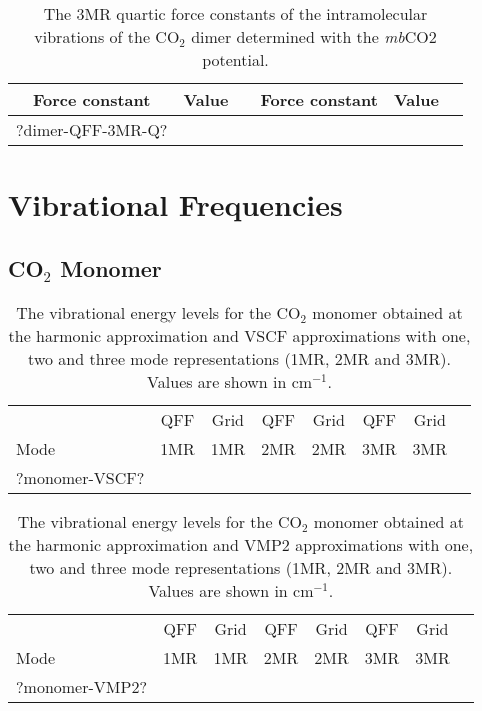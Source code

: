 \documentclass[aip,jcp,showpacs,superscriptaddress,groupedaddress]{revtex4-1}  %
\begin{document}
\begin{table}[H]
\centering
\caption{The 3MR quartic force constants of the intramolecular vibrations of the CO$_2$ dimer determined with the \emph{mb}CO2 potential.}
\label{table:qff_dimer-3mr-q}
\begin{ruledtabular}
\begin{tabular}{cccccc}
Force constant & Value      &  & Force constant & Value      &    \\
\hline \Tstrut
?dimer-QFF-3MR-Q?
\end{tabular}
\end{ruledtabular}
\end{table}

\section[S2]{\label{sec:vibrations}Vibrational Frequencies}

\subsection{\label{sec:monomer-freq}CO$_2$ Monomer}

\begin{table}[H]
\caption{The vibrational energy levels for the CO$_2$ monomer obtained at the harmonic approximation and VSCF approximations with one, two and three mode representations (1MR, 2MR and 3MR). Values are shown in cm$^{-1}$.}
\begin{ruledtabular}
\begin{tabular}{lccccccc}
    & QFF &  Grid & QFF & Grid & QFF & Grid   \\  
  Mode & 1MR & 1MR & 2MR & 2MR & 3MR & 3MR   \\ 
\hline \Tstrut
?monomer-VSCF?
\end{tabular}
\end{ruledtabular}
\label{table:monomer-vscf}
\end{table}  

\begin{table}[h]
\caption{The vibrational energy levels for the CO$_2$ monomer obtained at the harmonic approximation and VMP2 approximations with one, two and three mode representations (1MR, 2MR and 3MR). Values are shown in cm$^{-1}$.}
\begin{ruledtabular}
\begin{tabular}{lccccccc}
    & QFF &  Grid & QFF & Grid & QFF & Grid   \\  
  Mode & 1MR & 1MR & 2MR & 2MR & 3MR & 3MR   \\ 
\hline \Tstrut
?monomer-VMP2?
\end{tabular}
\end{ruledtabular}
\label{table:monomer-vmp2}
\end{table}
\end{document}

